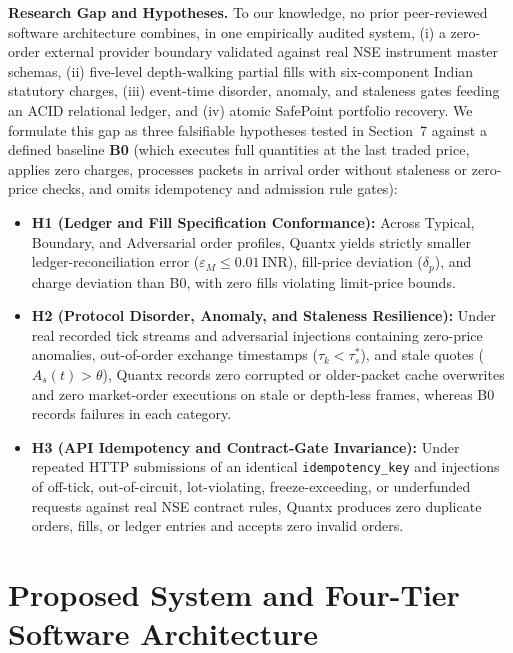 \documentclass[12pt]{article}
\newcommand{\thinunit}[2]{#1\,\text{#2}}
\begin{document}
\textbf{Research Gap and Hypotheses.} To our knowledge, no prior peer-reviewed software architecture combines, in one empirically audited system, (i) a zero-order external provider boundary validated against real NSE instrument master schemas, (ii) five-level depth-walking partial fills with six-component Indian statutory charges, (iii) event-time disorder, anomaly, and staleness gates feeding an ACID relational ledger, and (iv) atomic SafePoint portfolio recovery. We formulate this gap as three falsifiable hypotheses tested in Section~7 against a defined baseline \textbf{B0} (which executes full quantities at the last traded price, applies zero charges, processes packets in arrival order without staleness or zero-price checks, and omits idempotency and admission rule gates):
\begin{itemize}
  \item \textbf{H1 (Ledger and Fill Specification Conformance):} Across Typical, Boundary, and Adversarial order profiles, Quantx yields strictly smaller ledger-reconciliation error ($\varepsilon_M \le \thinunit{0.01}{INR}$), fill-price deviation ($\delta_p$), and charge deviation than B0, with zero fills violating limit-price bounds.
  \item \textbf{H2 (Protocol Disorder, Anomaly, and Staleness Resilience):} Under real recorded tick streams and adversarial injections containing zero-price anomalies, out-of-order exchange timestamps ($\tau_k < \tau^*_s$), and stale quotes ($A_s(t) > \theta$), Quantx records zero corrupted or older-packet cache overwrites and zero market-order executions on stale or depth-less frames, whereas B0 records failures in each category.
  \item \textbf{H3 (API Idempotency and Contract-Gate Invariance):} Under repeated HTTP submissions of an identical \texttt{idempotency\_key} and injections of off-tick, out-of-circuit, lot-violating, freeze-exceeding, or underfunded requests against real NSE contract rules, Quantx produces zero duplicate orders, fills, or ledger entries and accepts zero invalid orders.
\end{itemize}

\section{Proposed System and Four-Tier Software Architecture}
\end{document}
